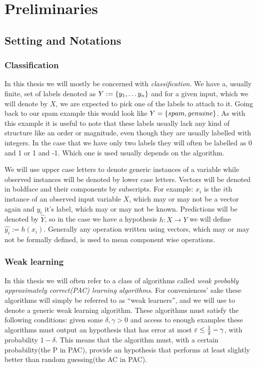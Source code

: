 
\chapter{Preliminaries}
\label{chap:prelim}
\section{Setting and Notations}
\subsection{Classification} 
\label{subsec:class}
\par  In this thesis we will mostly be concerned with \textit{classification}\cite{Hastie2009}. We have a, usually finite, set of labels denoted as $Y:=\left\{y_1,\ldots y_n\right\}$ and for a given input, which we will denote by $X$, we are expected to pick one of the labels to attach to it. Going back to our spam example this would look like $Y=\left\{spam, genuine\right\}$. As with this example it is useful to note that these labels usually lack any kind of structure like an order or magnitude, even though they are usually labelled with integers. In the case that we have only two labels they will often be labelled as 0 and 1 or 1 and -1. Which one is used usually depends on the algorithm. 

\par We will use upper case letters to denote generic instances of a variable while observed instances will be denoted by lower case letters. Vectors will be denoted in boldface and their components by subscripts. For example: $x_i$ is the $i$th instance of an observed input variable $X$, which may or may not be a vector again and $y_i$ it's label, which may or may not be known.  Predictions will be denoted by $\hat Y$, so in the case we have a hypothesis $h:X\to Y$ we will define $\hat{y_i}:=h(x_i)$. Generally any operation written using vectors, which may or may not be formally defined, is used to mean component wise operations. 

\subsection{Weak learning}
\label{subsec:weak}
In this thesis we will often refer to a class of algorithms called \textit{weak probably approximately correct(PAC) learning algorithms}\cite{Freund1997}. For conveniences' sake these algorithms will simply be referred to as ``weak learners'', and we will use \weak to denote a generic weak learning algorithm. These algorithms must satisfy the following conditions: given some $\delta,\gamma >0$ and access to enough examples these algorithms must output an hypothesis that has error at most $\varepsilon \leq \frac12-\gamma$, with probability $1-\delta$. This means that the algorithm must, with a certain probability(the P in PAC), provide an hypothesis that performs at least slightly better than random guessing(the AC in PAC). 

